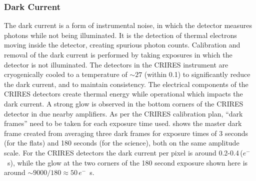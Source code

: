 \subsubsection{Dark Current}
\label{subsubsec:darkcurrent}
The dark current is a form of instrumental noise, in which the detector measures photons while not being illuminated. It is the detection of thermal electrons moving inside the detector, creating spurious photon counts. Calibration and removal of the dark current is performed by taking exposures in which the detector is not illuminated.
The detectors in the {CRIRES} instrument are cryogenically cooled to a temperature of \(\sim 27\)\K{} (within 0.1\K{}) to significantly reduce the dark current, and to maintain consistency. The electrical components of the {CRIRES} detectors create thermal energy while operational which impacts the dark current. A strong glow is observed in the bottom corners of the {CRIRES} detector in  due nearby amplifiers. As per the {CRIRES} calibration plan, ``dark frames'' need to be taken for each exposure time used.  shows the master dark frame created from averaging three dark frames for exposure times of 3 seconds (for the flats) and 180 seconds (for the science), both on the same amplitude scale.
For the {CRIRES} detectors the dark current per pixel is around 0.2-0.4\,(\(e^{-}\)\si{\per\second}), while the glow at the two corners of the 180 second exposure shown here is around \(\sim9000 / 180\approx50\)\,\(e^{-}\)\si{\per\second}.

%


